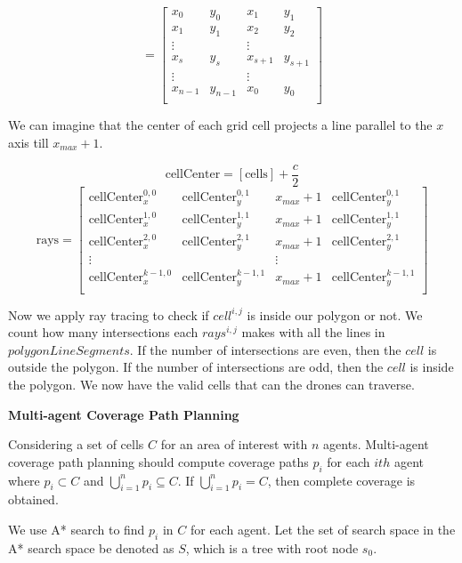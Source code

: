 $$=\begin{bmatrix}
x_0 & y_0 & x_1 & y_1 \\
x_1 & y_1 & x_2 & y_2\\
\vdots && \vdots \\
x_s & y_s & x_{s+1} & y_{s+1} \\
\vdots && \vdots \\
x_{n-1} & y_{n-1} & x_{0} & y_{0} \\
\end{bmatrix}$$

We can imagine that the center of each grid cell projects a line parallel to the $x$ axis till $x_{max} + 1$.

$$\text{cellCenter} = [\text{cells}] +  \frac{c}{2}$$
$$\text{rays} = \begin{bmatrix}
\text{cellCenter}_x^{0,0} & \text{cellCenter}_y^{0,1} & x_{max} + 1 & \text{cellCenter}_y^{0,1} \\
\text{cellCenter}_x^{1,0} & \text{cellCenter}_y^{1,1} & x_{max} + 1 & \text{cellCenter}_y^{1,1} \\
\text{cellCenter}_x^{2,0} & \text{cellCenter}_y^{2,1} & x_{max} + 1 & \text{cellCenter}_y^{2,1} \\
\vdots && \vdots \\
\text{cellCenter}_x^{k-1,0} & \text{cellCenter}_y^{k-1,1} & x_{max} + 1 & \text{cellCenter}_y^{k-1,1} \\
\end{bmatrix}
$$


Now we apply ray tracing to check if $cell^{i,j}$ is inside our polygon or not. We count how many intersections each $rays^{i,j}$ makes with all the lines in $polygonLineSegments$. If the number of intersections are even, then the $cell$ is outside the polygon. If the number of intersections are odd, then the $cell$ is inside the polygon. We now have the valid cells that can the drones can traverse.


\textbf{Multi-agent Coverage Path Planning}

Considering a set of cells  $C$ for an area of interest with $n$ agents.  Multi-agent coverage path planning should compute coverage paths $p_i$ for each $ith$ agent where $p_i \subset C$ and  $\bigcup\limits_{i=1}^{n} p_i \subseteq C$. If $\bigcup\limits_{i=1}^{n} p_i = C$, then complete coverage is obtained.

We use A* search to find $p_i$ in $C$ for each agent. Let the set of search space in the A* search space be denoted as $S$, which is a tree with root node $s_0$.

